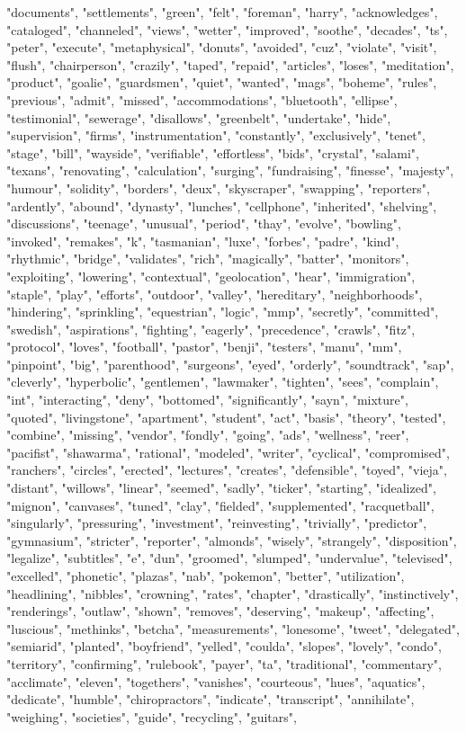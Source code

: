 "documents", "settlements", "green", "felt", "foreman", "harry", "acknowledges", "cataloged", "channeled", "views", "wetter", "improved", "soothe", "decades", "ts", "peter", "execute", "metaphysical", "donuts", "avoided", "cuz", "violate", "visit", "flush", "chairperson", "crazily", "taped", "repaid", "articles", "loses", "meditation", "product", "goalie", "guardsmen", "quiet", "wanted", "mags", "boheme", "rules", "previous", "admit", "missed", "accommodations", "bluetooth", "ellipse", "testimonial", "sewerage", "disallows", "greenbelt", "undertake", "hide", "supervision", "firms", "instrumentation", "constantly", "exclusively", "tenet", "stage", "bill", "wayside", "verifiable", "effortless", "bids", "crystal", "salami", "texans", "renovating", "calculation", "surging", "fundraising", "finesse", "majesty", "humour", "solidity", "borders", "deux", "skyscraper", "swapping", "reporters", "ardently", "abound", "dynasty", "lunches", "cellphone", "inherited", "shelving", "discussions", "teenage", "unusual", "period", "thay", "evolve", "bowling", "invoked", "remakes", "k", "tasmanian", "luxe", "forbes", "padre", "kind", "rhythmic", "bridge", "validates", "rich", "magically", "batter", "monitors", "exploiting", "lowering", "contextual", "geolocation", "hear", "immigration", "staple", "play", "efforts", "outdoor", "valley", "hereditary", "neighborhoods", "hindering", "sprinkling", "equestrian", "logic", "mmp", "secretly", "committed", "swedish", "aspirations", "fighting", "eagerly", "precedence", "crawls", "fitz", "protocol", "loves", "football", "pastor", "benji", "testers", "manu", "mm", "pinpoint", "big", "parenthood", "surgeons", "eyed", "orderly", "soundtrack", "sap", "cleverly", "hyperbolic", "gentlemen", "lawmaker", "tighten", "sees", "complain", "int", "interacting", "deny", "bottomed", "significantly", "sayn", "mixture", "quoted", "livingstone", "apartment", "student", "act", "basis", "theory", "tested", "combine", "missing", "vendor", "fondly", "going", "ads", "wellness", "reer", "pacifist", "shawarma", "rational", "modeled", "writer", "cyclical", "compromised", "ranchers", "circles", "erected", "lectures", "creates", "defensible", "toyed", "vieja", "distant", "willows", "linear", "seemed", "sadly", "ticker", "starting", "idealized", "mignon", "canvases", "tuned", "clay", "fielded", "supplemented", "racquetball", "singularly", "pressuring", "investment", "reinvesting", "trivially", "predictor", "gymnasium", "stricter", "reporter", "almonds", "wisely", "strangely", "disposition", "legalize", "subtitles", "e", "dun", "groomed", "slumped", "undervalue", "televised", "excelled", "phonetic", "plazas", "nab", "pokemon", "better", "utilization", "headlining", "nibbles", "crowning", "rates", "chapter", "drastically", "instinctively", "renderings", "outlaw", "shown", "removes", "deserving", "makeup", "affecting", "luscious", "methinks", "betcha", "measurements", "lonesome", "tweet", "delegated", "semiarid", "planted", "boyfriend", "yelled", "coulda", "slopes", "lovely", "condo", "territory", "confirming", "rulebook", "payer", "ta", "traditional", "commentary", "acclimate", "eleven", "togethers", "vanishes", "courteous", "hues", "aquatics", "dedicate", "humble", "chiropractors", "indicate", "transcript", "annihilate", "weighing", "societies", "guide", "recycling", "guitars", 